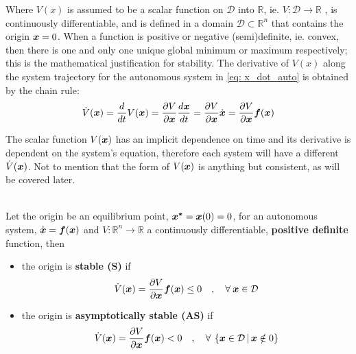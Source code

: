 \documentclass[12pt]{ucthesis}
\begin{document}
Where $V(x)$ is assumed to be a scalar function on $\mathcal{D}$ into $\mathbb{R}$, ie. $V:\mathcal{D} \rightarrow \mathbb{R}$ , is continuously differentiable, and is defined in a domain $\mathcal{D} \subset \mathbb{R}^n$ that contains the origin $\boldsymbol{x}=0$. When a function is positive or negative (semi)definite, ie. convex, then there is one and only one unique global minimum or maximum respectively; this is the mathematical justification for stability. The derivative of $V(x)$ along the system trajectory for the autonomous system in \autoref{eq: x_dot_auto} is obtained by the chain rule:
%
	\begin{equation}
		\dot{V}(\boldsymbol{x}) = \frac{d}{dt}V(\boldsymbol{x}) = \frac{\partial V}{\partial\boldsymbol{x}} \frac{d\boldsymbol{x}}{dt} = \frac{\partial V}{\partial\boldsymbol{x}}  \dot{\boldsymbol{x}} = \frac{\partial V}{\partial\boldsymbol{x}}  \boldsymbol{f}(\boldsymbol{x})
		\label{eq: v_dot}
	\end{equation} 

\noindent The scalar function $V(\boldsymbol{x})$ has an implicit dependence on time and its derivative is dependent on the system's equation, therefore each system will have a different $\dot{V}(\boldsymbol{x})$. Not to mention that the form of $V(\boldsymbol{x})$ is anything but consistent, as will be covered later.

\begin{thm} \alignright \citet[Thm. 3.1]{Khalil1996} \label{thm: lyapunov}\\
Let the origin be an equilibrium point, $\boldsymbol{x^*}=\boldsymbol{x}(0)=0$, for an autonomous system, $\dot{\boldsymbol{x}} = \boldsymbol{f}(\boldsymbol{x})$ and $V:\mathbb{R}^n \rightarrow \mathbb{R}$ a continuously differentiable, \textbf{positive definite} function, then
\begin{itemize}[labelindent=\parindent,leftmargin=\parindent,topsep=0pt,parsep=0pt,partopsep=0pt]%
	\item{the origin is \textbf{stable (S)} if
		\begin{align} \displaystyle
			\dot{V}(\vect{x}) = \pd{V}{\vect{x}} \vect{f}(\vect{x}) \leq 0 \quad,\quad \forall \: \vect{x} \in \mathcal{D} 
			\label{eq: lyapunov_s} %
		\end{align}
	}
	\item{the origin is \textbf{asymptotically stable (AS)} if
		\begin{align}
			\dot{V}(\boldsymbol{x}) = \frac{\partial V}{\partial\boldsymbol{x}} \boldsymbol{f}(\boldsymbol{x}) < 0 \quad,\quad \forall \: \left\lbrace \boldsymbol{x} \in \mathcal{D} \, | \, \boldsymbol{x} \notin 0 \right\rbrace
			\label{eq: lyapunov_as}
		\end{align}
	}
\end{itemize}
\end{thm}
\end{document}
